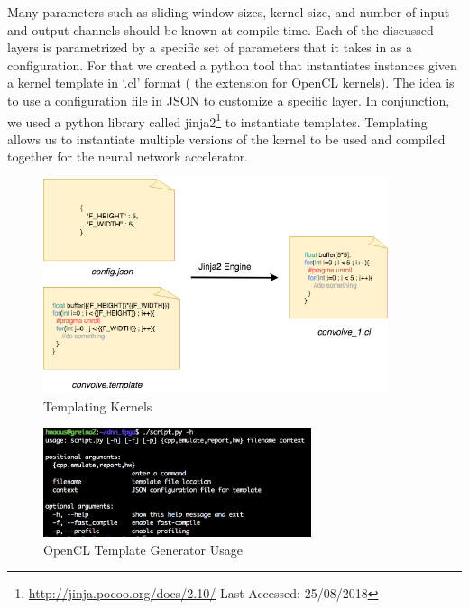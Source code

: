 Many parameters such as sliding window sizes, kernel size, and number of input and output channels should be known at compile time. Each of the discussed layers is parametrized by a specific set of parameters that it takes in as a configuration. For that we created a python tool that instantiates instances  given a kernel template in ‘.cl’ format ( the extension for OpenCL kernels). The idea is to use a configuration file in JSON to customize a specific layer. In conjunction, we used a python library called jinja2\footnote{\url{http://jinja.pocoo.org/docs/2.10/} Last Accessed: 25/08/2018} to instantiate templates. Templating allows us to instantiate multiple versions of the kernel to be used and compiled together for the neural network accelerator.


\begin{figure}[h!]
\centering
\includegraphics[width=0.9\textwidth]{Figures/jinja}
\decoRule
\caption[Templating Kernels]{ Templating Kernels }
\label{fig:jinja}
\end{figure}

\begin{figure}[h!]
\centering
\includegraphics[width=0.7\textwidth]{Figures/usage}
\decoRule
\caption[Tempate Generator Usage]{ OpenCL Template Generator Usage }
\label{fig:usage}
\end{figure}

